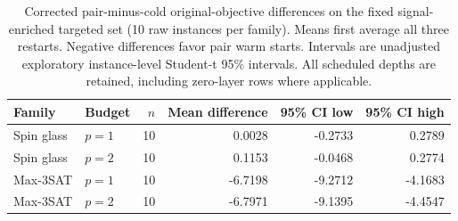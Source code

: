 \begin{table}[tb]
\centering
\small
\begin{tabular}{llrrrr}
\hline
Family & Budget & $n$ & Mean difference & 95\% CI low & 95\% CI high \\
\hline
Spin glass & $p=1$ & 10 & 0.0028 & -0.2733 & 0.2789 \\
Spin glass & $p=2$ & 10 & 0.1153 & -0.0468 & 0.2774 \\
Max-3SAT & $p=1$ & 10 & -6.7198 & -9.2712 & -4.1683 \\
Max-3SAT & $p=2$ & 10 & -6.7971 & -9.1395 & -4.4547 \\
\hline
\end{tabular}
\caption{Corrected pair-minus-cold original-objective differences on the fixed signal-enriched targeted set (10 raw instances per family). Means first average all three restarts. Negative differences favor pair warm starts. Intervals are unadjusted exploratory instance-level Student-t 95\% intervals. All scheduled depths are retained, including zero-layer rows where applicable.}
\label{tab:targeted-warmstart-coordinate-corrected}
\end{table}
